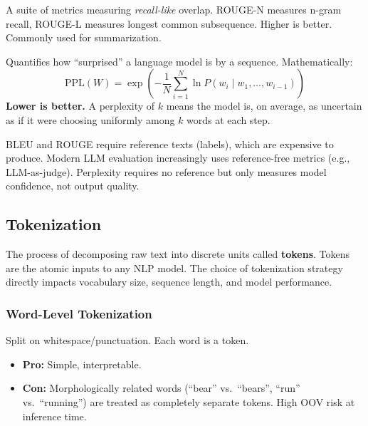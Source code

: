 \documentclass[11pt, a4paper]{article}
\begin{document}
\begin{defbox}
A suite of metrics measuring \emph{recall-like} overlap. ROUGE-N measures n-gram recall, ROUGE-L measures longest common subsequence. Higher is better. Commonly used for summarization.
\end{defbox}

\begin{defbox}
Quantifies how ``surprised'' a language model is by a sequence. Mathematically:
\[
\text{PPL}(W) = \exp\!\left(-\frac{1}{N}\sum_{i=1}^{N}\ln P(w_i \mid w_1, \ldots, w_{i-1})\right)
\]
\textbf{Lower is better.} A perplexity of $k$ means the model is, on average, as uncertain as if it were choosing uniformly among $k$ words at each step.
\end{defbox}

\begin{warnbox}
BLEU and ROUGE require reference texts (labels), which are expensive to produce. Modern LLM evaluation increasingly uses reference-free metrics (e.g., LLM-as-judge). Perplexity requires no reference but only measures model confidence, not output quality.
\end{warnbox}

\subsection{Tokenization}

\begin{defbox}
The process of decomposing raw text into discrete units called \textbf{tokens}. Tokens are the atomic inputs to any NLP model. The choice of tokenization strategy directly impacts vocabulary size, sequence length, and model performance.
\end{defbox}

\subsubsection{Word-Level Tokenization}

Split on whitespace/punctuation. Each word is a token.

\begin{itemize}[leftmargin=2em]
  \item \textbf{Pro:} Simple, interpretable.
  \item \textbf{Con:} Morphologically related words (``bear'' vs.\ ``bears'', ``run'' vs.\ ``running'') are treated as completely separate tokens. High OOV risk at inference time.
\end{itemize}
\end{document}
